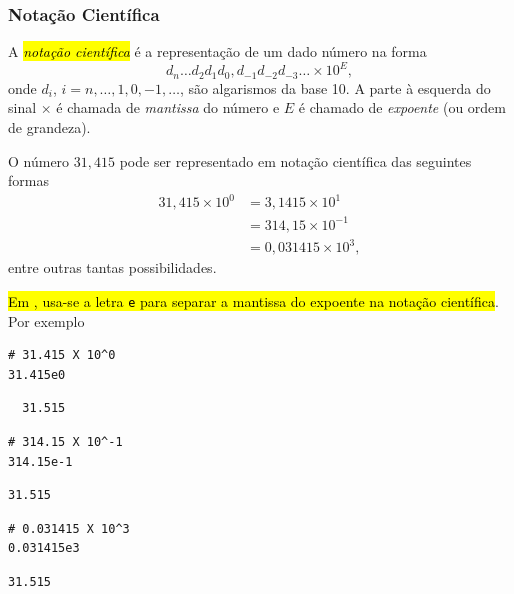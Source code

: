 \subsubsection{Notação Científica}

A \hl{\emph{notação científica}} é a representação de um dado número na forma
\begin{equation}
  d_{n}\ldots d_2d_1d_0,d_{-1}d_{-2}d_{-3}\ldots \times 10^{E},
\end{equation}
onde $d_i$, $i=n, \ldots, 1, 0, -1, \ldots$, são algarismos da base 10. A parte à esquerda do sinal $\times$ é chamada de \emph{mantissa} do número e $E$ é chamado de \emph{expoente} (ou ordem de grandeza).

\begin{ex}\label{cap_lingua_sec_numop:ex:notacao_cientifica}
  O número $31,415$ pode ser representado em notação científica das seguintes formas
  \begin{align}
    31,415\times 10^0 &= 3,1415\times 10^{1} \\
                      &= 314,15\times 10^{-1} \\
                      &= 0,031415\times 10^{3},
  \end{align}
  entre outras tantas possibilidades.

  \hl{Em {\python}, usa-se a letra \texttt{e} para separar a mantissa do expoente na notação científica}. Por exemplo

\begin{lstlisting}
# 31.415 X 10^0
31.415e0  
\end{lstlisting}

\begin{verbatim}
  31.515
\end{verbatim}

\begin{lstlisting}
# 314.15 X 10^-1
314.15e-1
\end{lstlisting}  

\begin{verbatim}
31.515  
\end{verbatim}

\begin{lstlisting}
# 0.031415 X 10^3
0.031415e3    
\end{lstlisting}

\begin{verbatim}
31.515  
\end{verbatim}
  
\end{ex}

